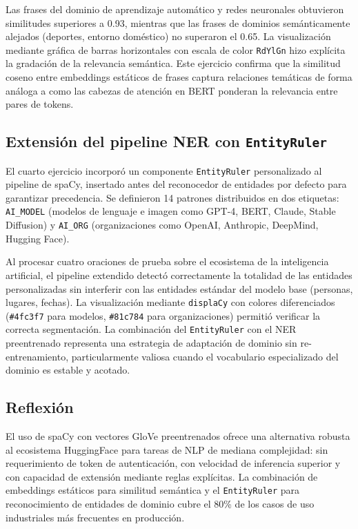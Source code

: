 \documentclass[12pt, a4paper]{article}
\begin{document}
Las frases del dominio de aprendizaje automático y redes neuronales obtuvieron similitudes superiores a 0.93, mientras que las frases de dominios semánticamente alejados (deportes, entorno doméstico) no superaron el 0.65. La visualización mediante gráfica de barras horizontales con escala de color \texttt{RdYlGn} hizo explícita la gradación de la relevancia semántica. Este ejercicio confirma que la similitud coseno entre embeddings estáticos de frases captura relaciones temáticas de forma análoga a como las cabezas de atención en BERT ponderan la relevancia entre pares de tokens.

\subsection{Extensión del pipeline NER con \texttt{EntityRuler}}

El cuarto ejercicio incorporó un componente \texttt{EntityRuler} personalizado al pipeline de spaCy, insertado antes del reconocedor de entidades por defecto para garantizar precedencia. Se definieron 14 patrones distribuidos en dos etiquetas: \texttt{AI\_MODEL} (modelos de lenguaje e imagen como GPT-4, BERT, Claude, Stable Diffusion) y \texttt{AI\_ORG} (organizaciones como OpenAI, Anthropic, DeepMind, Hugging Face).

Al procesar cuatro oraciones de prueba sobre el ecosistema de la inteligencia artificial, el pipeline extendido detectó correctamente la totalidad de las entidades personalizadas sin interferir con las entidades estándar del modelo base (personas, lugares, fechas). La visualización mediante \texttt{displaCy} con colores diferenciados (\texttt{\#4fc3f7} para modelos, \texttt{\#81c784} para organizaciones) permitió verificar la correcta segmentación. La combinación del \texttt{EntityRuler} con el NER preentrenado representa una estrategia de adaptación de dominio sin re-entrenamiento, particularmente valiosa cuando el vocabulario especializado del dominio es estable y acotado.

\subsection{Reflexión}

El uso de spaCy con vectores GloVe preentrenados ofrece una alternativa robusta al ecosistema HuggingFace para tareas de NLP de mediana complejidad: sin requerimiento de token de autenticación, con velocidad de inferencia superior y con capacidad de extensión mediante reglas explícitas. La combinación de embeddings estáticos para similitud semántica y el \texttt{EntityRuler} para reconocimiento de entidades de dominio cubre el 80\% de los casos de uso industriales más frecuentes en producción.
\end{document}
